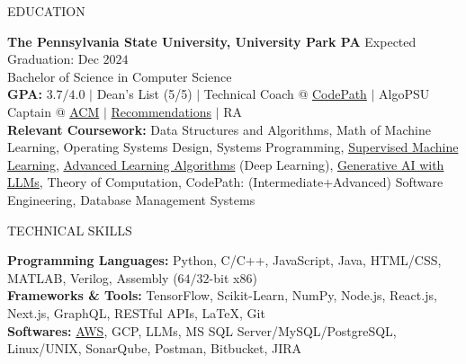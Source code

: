 \documentclass{resume} %
\begin{document}

\begin{rSection}{EDUCATION}

{\bf The Pennsylvania State University, University Park PA} \hfill {Expected Graduation: Dec $2024$}\\
{Bachelor of Science in Computer Science}\\
{\bf GPA:} $3.7/4.0$ $\vert$ Dean's List (5/5) $\vert$ Technical Coach @ \href{https://www.codepath.org/en-us/volunteers/technical-interview-coaching}{CodePath} $\vert$ AlgoPSU Captain @ \href{https://acm.psu.edu/algopsu/}{ACM} $\vert$ \href{https://www.linkedin.com/in/harshitjain17/details/recommendations/}{Recommendations} $\vert$ RA \\
{\bf Relevant Coursework:} Data Structures and Algorithms, Math of Machine Learning, Operating Systems Design, Systems Programming, \href{https://www.coursera.org/account/accomplishments/verify/JYX5UB5YP4YD}{Supervised Machine Learning}, \href{https://www.coursera.org/account/accomplishments/records/PBF4QN2KQL4Z}{Advanced Learning Algorithms} (Deep Learning), \href{https://www.coursera.org/account/accomplishments/verify/3W6HA4ZC7UTY}{Generative AI with LLMs}, Theory of Computation, CodePath: (Intermediate+Advanced) Software Engineering, Database Management Systems

\end{rSection}


\begin{rSection}{TECHNICAL SKILLS}

{\bf Programming Languages:} Python, C/C++, JavaScript, Java, HTML/CSS, MATLAB, Verilog, Assembly ($64/32$-bit x$86$)\\
{\bf Frameworks \& Tools:} TensorFlow, Scikit-Learn, NumPy, Node.js, React.js, Next.js, GraphQL, RESTful APIs, LaTeX, Git\\
{\bf Softwares:} \href{https://www.coursera.org/account/accomplishments/verify/7L8L8YQTMCPZ}{AWS}, GCP, LLMs, MS SQL Server/MySQL/PostgreSQL, Linux/UNIX, SonarQube, Postman, Bitbucket, JIRA

\end{rSection}
\end{document}
